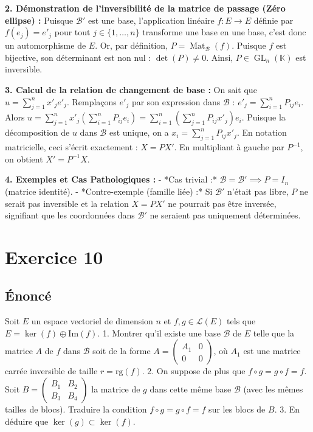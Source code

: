 \documentclass{report}
\begin{document}
\textbf{2. Démonstration de l'inversibilité de la matrice de passage (Zéro ellipse) :}
Puisque $\mathcal{B}'$ est une base, l'application linéaire $f : E \to E$ définie par $f(e_j) = e'_j$ pour tout $j \in \{1, \dots, n\}$ transforme une base en une base, c'est donc un automorphisme de $E$.
Or, par définition, $P = \operatorname{Mat}_{\mathcal{B}}(f)$.
Puisque $f$ est bijective, son déterminant est non nul : $\det(P) \neq 0$.
Ainsi, $P \in \operatorname{GL}_n(\mathbb{K})$ est inversible.

\textbf{3. Calcul de la relation de changement de base :}
On sait que $u = \sum_{j=1}^n x'_j e'_j$.
Remplaçons $e'_j$ par son expression dans $\mathcal{B}$ : $e'_j = \sum_{i=1}^n P_{ij} e_i$.
Alors $u = \sum_{j=1}^n x'_j \left( \sum_{i=1}^n P_{ij} e_i \right) = \sum_{i=1}^n \left( \sum_{j=1}^n P_{ij} x'_j \right) e_i$.
Puisque la décomposition de $u$ dans $\mathcal{B}$ est unique, on a $x_i = \sum_{j=1}^n P_{ij} x'_j$.
En notation matricielle, ceci s'écrit exactement : $X = P X'$.
En multipliant à gauche par $P^{-1}$, on obtient $X' = P^{-1} X$.

\textbf{4. Exemples et Cas Pathologiques :}
- *Cas trivial :* $\mathcal{B} = \mathcal{B}' \implies P = I_n$ (matrice identité).
- *Contre-exemple (famille liée) :* Si $\mathcal{B}'$ n'était pas libre, $P$ ne serait pas inversible et la relation $X = P X'$ ne pourrait pas être inversée, signifiant que les coordonnées dans $\mathcal{B}'$ ne seraient pas uniquement déterminées.


\section*{Exercice 10}
\subsection*{Énoncé}
Soit $E$ un espace vectoriel de dimension $n$ et $f, g \in \mathcal{L}(E)$ tels que $E = \ker(f) \oplus \text{Im}(f)$.
1. Montrer qu'il existe une base $\mathcal{B}$ de $E$ telle que la matrice $A$ de $f$ dans $\mathcal{B}$ soit de la forme $A = \begin{pmatrix} A_1 & 0 \\ 0 & 0 \end{pmatrix}$, où $A_1$ est une matrice carrée inversible de taille $r = \text{rg}(f)$.
2. On suppose de plus que $f \circ g = g \circ f = f$. Soit $B = \begin{pmatrix} B_1 & B_2 \\ B_3 & B_4 \end{pmatrix}$ la matrice de $g$ dans cette même base $\mathcal{B}$ (avec les mêmes tailles de blocs).
Traduire la condition $f \circ g = g \circ f = f$ sur les blocs de $B$.
3. En déduire que $\ker(g) \subset \ker(f)$.
\end{document}
